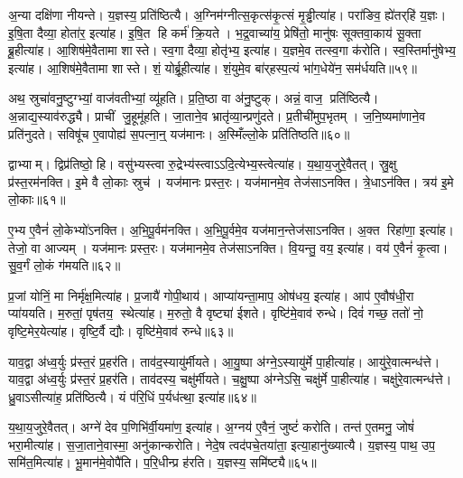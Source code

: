 अ॒न्या दक्षि॑णा नीयन्ते।
य॒ज्ञस्य॒ प्रति॑ष्ठित्यै।
अ॒ग्निम॑ग्नीत्स॒कृत्स॑कृ॒त्सं मृ॒ड्ढीत्या॑ह।
परा॑ङिव॒ ह्ये॑तर्‌हि॑ य॒ज्ञः।
इ॒षि॒ता दैव्या॒ होता॑र॒ इत्या॑ह।
इ॒षि॒त हि कर्म॑ क्रि॒यते।
भ॒द्र॒वाच्या॑य॒ प्रेषि॑तो॒ मानु॑षः सूक्तवा॒काय॑ सू॒क्ता ब्रू॒हीत्या॑ह।
आ॒शिष॑मे॒वैतामा शास्ते।
स्व॒गा दैव्या॒ होतृ॑भ्य॒ इत्या॑ह।
य॒ज्ञमे॒व तत्स्व॒गा क॑रोति।
स्व॒स्तिर्मानु॑षेभ्य॒ इत्या॑ह।
आ॒शिष॑मे॒वैतामा शास्ते।
शं॒ योर्ब्रू॒हीत्या॑ह।
शं॒युमे॒व बा॑र्‌हस्प॒त्यं भा॑ग॒धेये॑न॒ सम॑र्धयति॥५९॥\anuvakamend[च॒र॒त्य॒ध्व॒र्युः प्रजा॑तिर्ह्वयते॒ वेदाब्रवीद्बर्‌हि॒षदं॑ करोत्यृ॒त्विजो॑ दधाति ब्र॒ह्माऽनु॑करोति च॒त्वारि॑ च]

अथ॒ स्रुचा॑वनु॒ष्टुग्भ्यां॒ वाज॑वतीभ्यां॒ व्यू॑हति।
प्र॒ति॒ष्ठा वा अ॑नु॒ष्टुक्।
अन्नं॒ वाज॒ प्रति॑ष्ठित्यै।
अ॒न्नाद्य॒स्याव॑रुद्ध्यै।
प्राचीं जु॒हूमू॑हति।
जा॒ताने॒व भ्रातृ॑व्या॒न्प्रणु॑दते।
प्र॒तीची॑मुप॒भृतम्।
ज॒नि॒ष्यमा॑णाने॒व प्रति॑नुदते।
सविषू॑च ए॒वापोह्य॑ स॒पत्ना॒न्॒ यज॑मानः।
अ॒स्मिँल्लो॒के प्रति॑तिष्ठति॥६०॥

द्वाभ्याम्।
द्विप्र॑तिष्ठो॒ हि।
वसु॑भ्यस्त्वा रु॒द्रेभ्य॑स्त्वाऽऽदि॒त्येभ्य॒स्त्वेत्या॑ह।
य॒था॒य॒जुरे॒वैतत्।
स्रु॒क्षु प्र॑स्त॒रम॑नक्ति।
इ॒मे वै लो॒काः स्रुच॑।
यज॑मानः प्रस्त॒रः।
यज॑मानमे॒व तेज॑साऽनक्ति।
त्रे॒धाऽन॑क्ति।
त्रय॑ इ॒मे लो॒काः॥६१॥

ए॒भ्य ए॒वैनं॑ लो॒केभ्यो॑ऽनक्ति।
अ॒भि॒पू॒र्वम॑नक्ति।
अ॒भि॒पू॒र्वमे॒व यज॑मान॒न्तेज॑साऽनक्ति।
अ॒क्त रिहा॑णा॒ इत्या॑ह।
तेजो॒ वा आज्यम्।
यज॑मानः प्रस्त॒रः।
यज॑मानमे॒व तेज॑साऽनक्ति।
वि॒यन्तु॒ वय॒ इत्या॑ह।
वय॑ ए॒वैनं॑ कृ॒त्वा।
सु॒व॒र्गं लो॒कं ग॑मयति॥६२॥

प्र॒जां योनिं॒ मा निर्मृ॑क्ष॒मित्या॑ह।
प्र॒जायै॑ गोपी॒थाय॑।
आप्या॑यन्ता॒माप॒ ओष॑धय॒ इत्या॑ह।
आप॑ ए॒वौष॑धी॒रा प्या॑ययति।
म॒रुतां॒ पृष॑तय॒ स्थेत्या॑ह।
म॒रुतो॒ वै वृष्ट्या॑ ईशते।
वृष्टि॑मे॒वाव॑ रुन्धे।
दिवं॑ गच्छ॒ ततो॑ नो॒ वृष्टि॒मेर॒येत्या॑ह।
वृष्टि॒र्वै द्यौः।
वृष्टि॑मे॒वाव॑ रुन्धे॥६३॥

याव॒द्वा अ॑ध्व॒र्युः प्र॑स्त॒रं प्र॒हर॑ति।
ताव॑द॒स्यायु॑र्मीयते।
आ॒यु॒ष्पा अ॑ग्ने॒ऽस्यायु॑र्मे पा॒हीत्या॑ह।
आयु॑रे॒वात्मन्ध॑त्ते।
याव॒द्वा अ॑ध्व॒र्युः प्र॑स्त॒रं प्र॒हर॑ति।
ताव॑दस्य॒ चक्षु॑र्मीयते।
च॒क्षु॒ष्पा अ॑ग्नेऽसि॒ चक्षु॑र्मे पा॒हीत्या॑ह।
चक्षु॑रे॒वात्मन्ध॑त्ते।
ध्रु॒वाऽसीत्या॑ह॒ प्रति॑ष्ठित्यै।
यं प॑रि॒धिं प॒र्यध॑त्था॒ इत्या॑ह॥६४॥

य॒था॒य॒जुरे॒वैतत्।
अग्ने॑ देव प॒णिभि॑र्वी॒यमा॑ण॒ इत्या॑ह।
अ॒ग्नय॑ ए॒वैनं॒ जुष्टं॑ करोति।
तन्त॑ ए॒तमनु॒ जोषं॑ भरा॒मीत्या॑ह।
स॒जा॒ताने॒वास्मा॒ अनु॑कान्करोति।
नेदे॒ष त्वद॑पचे॒तया॑ता॒ इत्या॒हानु॑ख्यात्यै।
य॒ज्ञस्य॒ पाथ॒ उप॒ समि॑त॒मित्या॑ह।
भू॒मान॑मे॒वोपै॑ति।
प॒रि॒धीन्प्र ह॑रति।
य॒ज्ञस्य॒ समि॑ष्ट्यै॥६५॥

